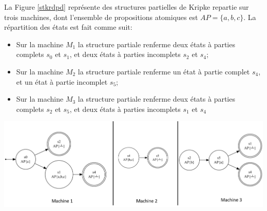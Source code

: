 La Figure \ref{stkrdpd} représente des structures partielles de Kripke repartie sur trois machines, dont l'ensemble de propositions atomiques est ${\displaystyle AP=\{a,b,c\}}$. La répartition des états est fait comme suit:  
\begin{itemize}
 \item Sur la machine $M_1$ la structure partiale renferme deux  états à parties complets $s_0$ et $s_1$, et deux états à parties incomplets $s_2$ et $s_4$;
 \item Sur la machine $M_2$ la structure partiale renferme un état à partie complet $s_4$, et un état à partie incomplet $s_5$;
 \item Sur la machine $M_3$ la structure partiale renferme deux  états à parties complets $s_2$ et $s_5$, et deux états à parties incomplets $s_1$ et $s_4$
 \end{itemize}

\begin{center}
	\includegraphics[scale=0.5]{img/stkd.PNG}
	 \label{stkrdpd}
 \end{center}